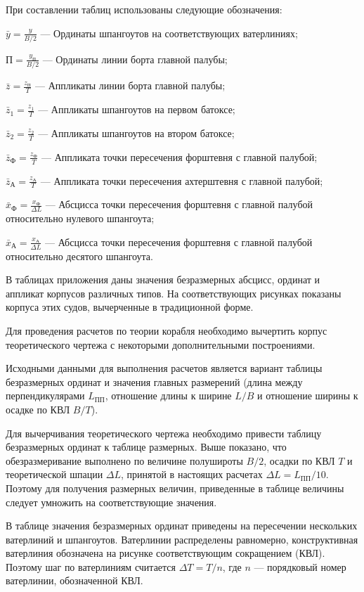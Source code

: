 При составлении таблиц использованы следующие обозначения:

$\bar{y} = \frac{y}{B/2}$ --- Ординаты шпангоутов на соответствующих ватерлиниях;

$\text{П} = \frac{y_П}{B/2}$ --- Ординаты линии борта главной палубы;

$\bar{z} = \frac{z_П}{T}$ --- Аппликаты линии борта главной палубы;

$\bar{z}_1 = \frac{z_1}{T}$ --- Аппликаты шпангоутов на первом батоксе;

$\bar{z}_2 = \frac{z_2}{T}$ --- Аппликаты шпангоутов на втором батоксе;

$\bar{z}_{\text{Ф}} = \frac{z_{\text{Ф}}}{T}$ --- Аппликата точки пересечения форштевня с главной палубой;

$\bar{z}_{\text{А}} = \frac{z_{\text{А}}}{T}$ --- Аппликата точки пересечения ахтерштевня с главной палубой;

$\bar{x}_{\text{Ф}} = \frac{x_{\text{Ф}}}{\Delta L}$ --- Абсцисса точки пересечения форштевня с главной палубой относительно нулевого шпангоута;

$\bar{x}_{\text{А}} = \frac{x_{\text{А}}}{\Delta L}$ --- Абсцисса точки пересечения форштевня с главной палубой относительно десятого шпангоута.

В таблицах приложения даны значения безразмерных абсцисс, ординат и аппликат корпусов различных типов.
На соответствующих рисунках показаны корпуса этих судов, вычерченные в традиционной форме.

Для проведения расчетов по теории корабля необходимо вычертить корпус теоретического чертежа с некоторыми дополнительными построениями.

Исходными данными для выполнения расчетов является вариант таблицы безразмерных ординат и значения главных размерений (длина между перпендикулярами $L_{\text{ПП}}$, отношение длины к ширине $L/B$ и отношение ширины к осадке по КВЛ $B/T$).

Для вычерчивания теоретического чертежа необходимо привести таблицу безразмерных ординат к таблице размерных.
Выше показано, что обезразмеривание выполнено по величине полушироты $B/2$, осадки по КВЛ $T$ и теоретической шпации $\Delta L$, принятой в настоящих расчетах $\Delta L = L_{\text{ПП}}/10$.
Поэтому для получения размерных величин, приведенные в таблице величины следует умножить на соответствующие значения.

В таблице значения безразмерных ординат приведены на пересечении нескольких ватерлиний и шпангоутов.
Ватерлинии распределены равномерно, конструктивная ватерлиния обозначена на рисунке соответствующим сокращением (КВЛ).
Поэтому шаг по ватерлиниям считается $\Delta T = T / n$, где $n$ — порядковый номер ватерлинии, обозначенной КВЛ.


